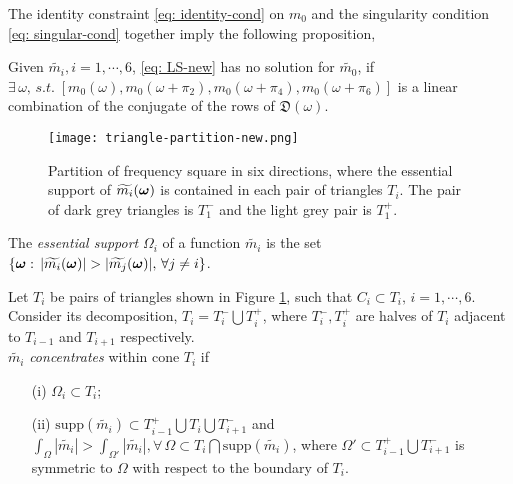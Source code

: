 The identity constraint \eqref{eq: identity-cond} on $m_0$ and the singularity condition \eqref{eq: singular-cond} together imply the following proposition,
\begin{proposition}\label{prop: feasibility}
Given $\widetilde{m_i}, i = 1,\cdots,6$, \eqref{eq: LS-new} has no solution for $\widetilde{m_0}$, if $\exists\,\omega, \,s.t. \; [m_0(\omega), m_0(\omega+\pi_2),m_0(\omega+\pi_4),m_0(\omega+\pi_6)]$ is a linear combination of the conjugate of the rows of $\mathfrak{D}(\omega)$.%
\end{proposition}
\begin{figure}
\centering
\texttt{[image: triangle-partition-new.png]}
\caption{Partition of frequency square in six directions, where the essential support of $\widetilde{m_{i}}(\boldsymbol{\omega})$ is contained in each pair of triangles $T_i$. The pair of dark grey triangles is $T_1^-$ and the light grey pair is $T_1^+$.}
\label{fig: partition 2}
\end{figure}

The {\it essential support} $\Omega_i$ of a function $\widetilde{m_i}$ is the set $\{\V{\omega}:\,|\widetilde{m_i}(\V{\omega})|> |\widetilde{m_j}(\V{\omega})|,\,\forall j\neq i\}$. \vspace{.5em}

Let $T_i$ be pairs of triangles shown in Figure \ref{fig: partition 2}, such that $C_i\subset T_i,\, i = 1,\cdots,6.$ Consider its decomposition, $T_i = T_i^-\bigcup T_i^+$, where $T_i^-, T_i^+$ are halves of $T_i$ adjacent  to $T_{i-1}$ and $T_{i+1}$ respectively.\\[.5em]
  $\widetilde{m_i}$ {\it concentrates} within cone $T_i$ if 
\begin{itemize}
\item[(i)] $\Omega_i\subset T_i$;
\item[(ii)]$\text{supp}(\widetilde{m_i})\subset T_{i-1}^+\bigcup T_i\bigcup T_{i+1}^-$ and $\int_\Omega|\widetilde{m_i}| > \int_{\Omega'}|\widetilde{m_i}|, \forall\, \Omega\subset T_i\bigcap\text{supp}(\widetilde{m_i})$, where $\Omega' \subset T_{i-1}^+\bigcup T_{i+1}^-$ is symmetric to $\Omega$ with respect to the boundary of $T_i$.
\end{itemize}

